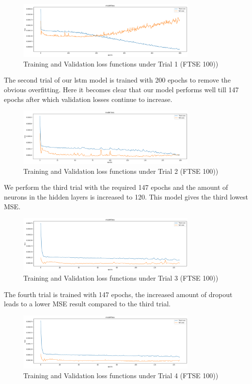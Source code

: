 \documentclass[a4paper,11pt,oneside]{book}
\begin{document}
\begin{figure}[!h]
	\centering
	\includegraphics[width=0.8\textwidth]{figures/FTSE1}
	\caption{Training and Validation loss functions under Trial 1 (FTSE 100))}
	\label{FTSE1}
\end{figure}
 The second trial of our lstm model is trained with 200 epochs to remove the obvious overfitting. Here it becomes clear that our model performs well till 147 epochs after which validation losses continue to increase. 
\begin{figure}[!h]
	\centering
	\includegraphics[width=0.8\textwidth]{figures/FTSE2}
	\caption{Training and Validation loss functions under Trial 2 (FTSE 100))}
	\label{FTSE2}
\end{figure}

 We perform the third trial with the required 147 epochs and the amount of neurons in the hidden layers is increased to 120. This model gives the third lowest MSE.

\begin{figure}[!h]
	\centering
	\includegraphics[width=0.8\textwidth]{figures/FTSE3}
	\caption{Training and Validation loss functions under Trial 3 (FTSE 100))}
	\label{FTSE3}
\end{figure}
 The fourth trial is trained with 147 epochs, the increased amount of dropout leads to a lower MSE result compared to the third trial. 
 \newpage

\begin{figure}[!h]
	\centering
	\includegraphics[width=0.8\textwidth]{figures/FTSE4}
	\caption{Training and Validation loss functions under Trial 4 (FTSE 100))}
	\label{FTSE4}
\end{figure}
\end{document}

